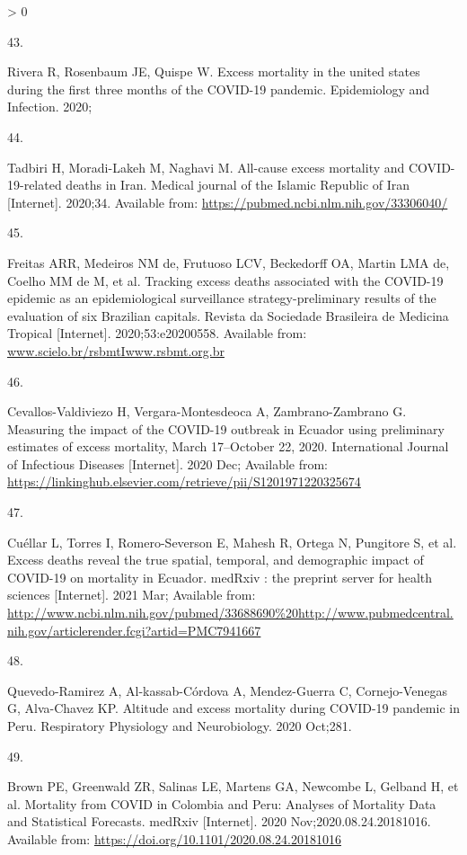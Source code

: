 \documentclass[
]{article}
\newlength{\cslhangindent}
\newlength{\csllabelwidth}
\newenvironment{CSLReferences}[2] %
 {%
  \setlength{\parindent}{0pt}
  \ifodd #1 \everypar{\setlength{\hangindent}{\cslhangindent}}\ignorespaces\fi
  \ifnum #2 > 0
  \setlength{\parskip}{#2\baselineskip}
  \fi
 }%
 {}
\newcommand{\CSLLeftMargin}[1]{\parbox[t]{\csllabelwidth}{#1}}
\newcommand{\CSLRightInline}[1]{\parbox[t]{\linewidth - \csllabelwidth}{#1}\break}
\begin{document}
\begin{CSLReferences}{0}{0}
\leavevmode\hypertarget{ref-Rivera2020}{}%
\CSLLeftMargin{43. }
\CSLRightInline{Rivera R, Rosenbaum JE, Quispe W. {Excess mortality in the united states during the first three months of the COVID-19 pandemic}. Epidemiology and Infection. 2020; }

\leavevmode\hypertarget{ref-Tadbiri2020}{}%
\CSLLeftMargin{44. }
\CSLRightInline{Tadbiri H, Moradi-Lakeh M, Naghavi M. {All-cause excess mortality and COVID-19-related deaths in Iran}. Medical journal of the Islamic Republic of Iran {[}Internet{]}. 2020;34. Available from: \url{https://pubmed.ncbi.nlm.nih.gov/33306040/}}

\leavevmode\hypertarget{ref-Freitas2020}{}%
\CSLLeftMargin{45. }
\CSLRightInline{Freitas ARR, Medeiros NM de, Frutuoso LCV, Beckedorff OA, Martin LMA de, Coelho MM de M, et al. {Tracking excess deaths associated with the COVID-19 epidemic as an epidemiological surveillance strategy-preliminary results of the evaluation of six Brazilian capitals}. Revista da Sociedade Brasileira de Medicina Tropical {[}Internet{]}. 2020;53:e20200558. Available from: \href{https://www.scielo.br/rsbmtIwww.rsbmt.org.br}{www.scielo.br/rsbmtIwww.rsbmt.org.br}}

\leavevmode\hypertarget{ref-Cevallos2020}{}%
\CSLLeftMargin{46. }
\CSLRightInline{Cevallos-Valdiviezo H, Vergara-Montesdeoca A, Zambrano-Zambrano G. {Measuring the impact of the COVID-19 outbreak in Ecuador using preliminary estimates of excess mortality, March 17--October 22, 2020}. International Journal of Infectious Diseases {[}Internet{]}. 2020 Dec; Available from: \url{https://linkinghub.elsevier.com/retrieve/pii/S1201971220325674}}

\leavevmode\hypertarget{ref-Cuellar2021}{}%
\CSLLeftMargin{47. }
\CSLRightInline{Cuéllar L, Torres I, Romero-Severson E, Mahesh R, Ortega N, Pungitore S, et al. {Excess deaths reveal the true spatial, temporal, and demographic impact of COVID-19 on mortality in Ecuador.} medRxiv : the preprint server for health sciences {[}Internet{]}. 2021 Mar; Available from: \url{http://www.ncbi.nlm.nih.gov/pubmed/33688690\%20http://www.pubmedcentral.nih.gov/articlerender.fcgi?artid=PMC7941667}}

\leavevmode\hypertarget{ref-Quevedo2020}{}%
\CSLLeftMargin{48. }
\CSLRightInline{Quevedo-Ramirez A, Al-kassab-Córdova A, Mendez-Guerra C, Cornejo-Venegas G, Alva-Chavez KP. {Altitude and excess mortality during COVID-19 pandemic in Peru}. Respiratory Physiology and Neurobiology. 2020 Oct;281. }

\leavevmode\hypertarget{ref-Brown2020}{}%
\CSLLeftMargin{49. }
\CSLRightInline{Brown PE, Greenwald ZR, Salinas LE, Martens GA, Newcombe L, Gelband H, et al. {Mortality from COVID in Colombia and Peru: Analyses of Mortality Data and Statistical Forecasts}. medRxiv {[}Internet{]}. 2020 Nov;2020.08.24.20181016. Available from: \url{https://doi.org/10.1101/2020.08.24.20181016}}


\end{CSLReferences}
\end{document}
